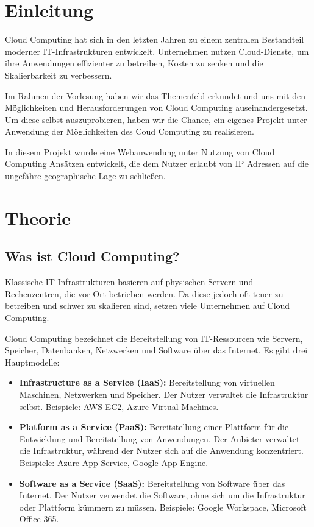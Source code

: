 \chapter{Einleitung}
Cloud Computing hat sich in den letzten Jahren zu einem zentralen Bestandteil moderner IT-Infrastrukturen entwickelt. Unternehmen nutzen Cloud-Dienste, um ihre Anwendungen effizienter zu betreiben, Kosten zu senken und die Skalierbarkeit zu verbessern. 

Im Rahmen der Vorlesung haben wir das Themenfeld erkundet und uns mit den Möglichkeiten und Herausforderungen von Cloud Computing auseinandergesetzt. Um diese selbst auszuprobieren, haben wir die Chance, ein eigenes Projekt unter Anwendung der Möglichkeiten des Coud Computing zu realisieren.

In diesem Projekt wurde eine Webanwendung unter Nutzung von Cloud Computing Ansätzen entwickelt, die dem Nutzer erlaubt von IP Adressen auf die ungefähre geographische Lage zu schließen.

\chapter{Theorie}
\section{Was ist Cloud Computing?}
Klassische IT-Infrastrukturen basieren auf physischen Servern und Rechenzentren, die vor Ort betrieben werden. Da diese jedoch oft teuer zu betreiben und schwer zu skalieren sind, setzen viele Unternehmen auf Cloud Computing.

Cloud Computing bezeichnet die Bereitstellung von IT-Ressourcen wie Servern, Speicher, Datenbanken, Netzwerken und Software über das Internet. Es gibt drei Hauptmodelle\cite{mell2011nist,hurwitz2010cloud,zhang2010towards}:
\begin{itemize}
    \item \textbf{Infrastructure as a Service (IaaS):} Bereitstellung von virtuellen Maschinen, Netzwerken und Speicher. Der Nutzer verwaltet die Infrastruktur selbst. Beispiele: AWS EC2, Azure Virtual Machines.
    \item \textbf{Platform as a Service (PaaS):} Bereitstellung einer Plattform für die Entwicklung und Bereitstellung von Anwendungen. Der Anbieter verwaltet die Infrastruktur, während der Nutzer sich auf die Anwendung konzentriert. Beispiele: Azure App Service, Google App Engine.
    \item \textbf{Software as a Service (SaaS):} Bereitstellung von Software über das Internet. Der Nutzer verwendet die Software, ohne sich um die Infrastruktur oder Plattform kümmern zu müssen. Beispiele: Google Workspace, Microsoft Office 365.
\end{itemize}

